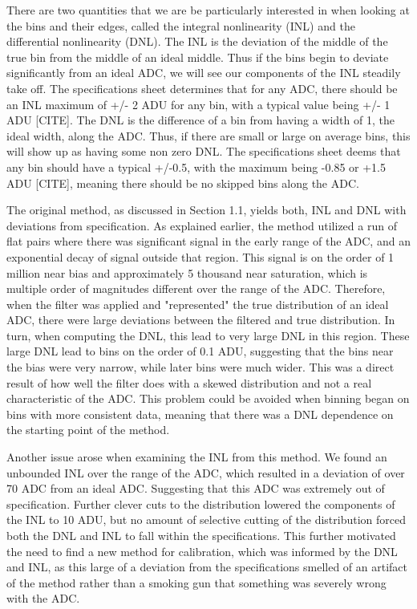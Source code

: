 \documentclass[11pt, letterpaper]{article}
\begin{document}
There are two quantities that we are be particularly interested in when looking at the bins and their edges, called the integral nonlinearity (INL) and the differential nonlinearity (DNL). 
The INL is the deviation of the middle of the true bin from the middle of an ideal middle. 
Thus if the bins begin to deviate significantly from an ideal ADC, we will see our components of the INL steadily take off. 
The specifications sheet determines that for any ADC, there should be an INL maximum of +/- 2 ADU for any bin, with a typical value being +/- 1 ADU [CITE]. 
The DNL is the difference of a bin from having a width of 1, the ideal width, along the ADC. 
Thus, if there are small or large on average bins, this will show up as having some non zero DNL. 
The specifications sheet deems that any bin should have a typical +/-0.5, with the maximum being -0.85 or +1.5 ADU [CITE], meaning there should be no skipped bins along the ADC. 
\indent


The original method, as discussed in Section 1.1, yields both, INL and DNL with deviations from specification. 
As explained earlier, the method utilized a run of flat pairs where there was significant signal in the early range of the ADC, and an exponential decay of signal outside that region. 
This signal is on the order of 1 million near bias and approximately 5 thousand near saturation, which is multiple order of magnitudes different over the range of the ADC. 
Therefore, when the filter was applied and "represented" the true distribution of an ideal ADC, there were large deviations between the filtered and true distribution. 
In turn, when computing the DNL, this lead to very large DNL in this region. 
These large DNL lead to bins on the order of 0.1 ADU, suggesting that the bins near the bias were very narrow, while later bins were much wider. 
This was a direct result of how well the filter does with a skewed distribution and not a real characteristic of the ADC. 
This problem could be avoided when binning began on bins with more consistent data, meaning that there was a DNL dependence on the starting point of the method. 
\indent 


Another issue arose when examining the INL from this method. 
We found an unbounded INL over the range of the ADC, which resulted in a deviation of over 70 ADC from an ideal ADC. 
Suggesting that this ADC was extremely out of specification. 
Further clever cuts to the distribution lowered the components of the INL to 10 ADU, but no amount of selective cutting of the distribution forced both the DNL and INL to fall within the specifications. 
This further motivated the need to find a new method for calibration, which was informed by the DNL and INL, as this large of a deviation from the specifications smelled of an artifact of the method rather than a smoking gun that something was severely wrong with the ADC. 
\end{document}
